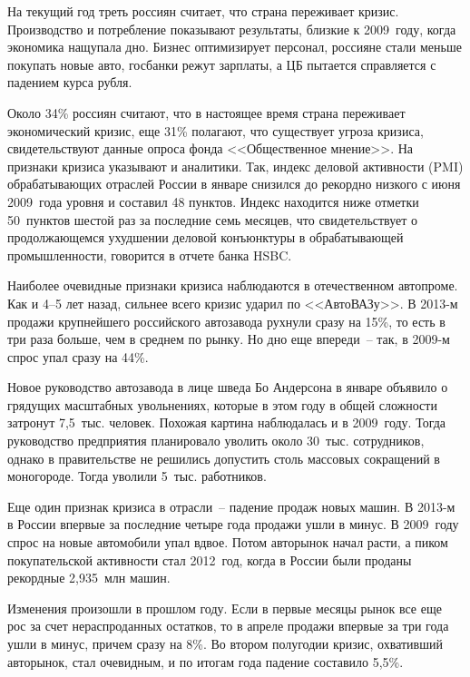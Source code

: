   На текущий год треть россиян считает, что страна переживает кризис.
  Производство и потребление показывают результаты, близкие к 2009~году, когда
  экономика нащупала дно. Бизнес оптимизирует персонал, россияне стали меньше
  покупать новые авто, госбанки режут зарплаты, а ЦБ пытается справляется с
  падением курса рубля.

  Около 34\% россиян считают, что в настоящее время страна переживает
  экономический кризис, еще 31\% полагают, что существует угроза кризиса,
  свидетельствуют данные опроса фонда <<Общественное мнение>>. На признаки
  кризиса указывают и аналитики. Так, индекс деловой активности (PMI)
  обрабатывающих отраслей России в январе снизился до рекордно низкого с июня
  2009~года уровня и составил 48 пунктов. Индекс находится ниже отметки
  50~пунктов шестой раз за последние семь месяцев, что свидетельствует о
  продолжающемся ухудшении деловой конъюнктуры в обрабатывающей промышленности,
  говорится в отчете банка HSBC.

  Наиболее очевидные признаки кризиса наблюдаются в отечественном автопроме.
  Как и 4--5 лет назад, сильнее всего кризис ударил по <<АвтоВАЗу>>.
  В 2013-м продажи крупнейшего российского автозавода рухнули сразу на 15\%,
  то есть в три раза больше, чем в среднем по рынку. Но дно еще впереди~-- так,
  в 2009-м спрос упал сразу на 44\%.

  Новое руководство автозавода в лице шведа Бо Андерсона в январе объявило о
  грядущих масштабных увольнениях, которые в этом году в общей сложности
  затронут 7,5~тыс. человек. Похожая картина наблюдалась и в 2009~году. Тогда
  руководство предприятия планировало уволить около 30~тыс. сотрудников, однако
  в правительстве не решились допустить столь массовых сокращений в моногороде.
  Тогда уволили 5~тыс. работников.

  Еще один признак кризиса в отрасли~-- падение продаж новых машин. В 2013-м в
  России впервые за последние четыре года продажи ушли в минус. В 2009~году
  спрос на новые автомобили упал вдвое. Потом авторынок начал расти, а пиком
  покупательской активности стал 2012~год, когда в России были проданы
  рекордные 2,935~млн машин.

  Изменения произошли в прошлом году. Если в первые месяцы рынок все еще рос за
  счет нераспроданных остатков, то в апреле продажи впервые за три года ушли в
  минус, причем сразу на 8\%. Во втором полугодии кризис, охвативший авторынок,
  стал очевидным, и по итогам года падение составило 5,5\%.

  \medskip

